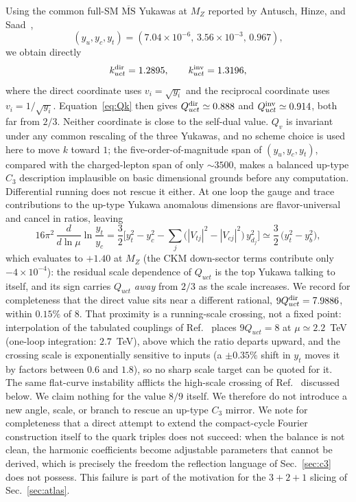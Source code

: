 \documentclass[aps,twocolumn,superscriptaddress,nofootinbib,floatfix]{revtex4-2}
\newcommand{\MSbar}{\overline{\mathrm{MS}}}
\begin{document}
Using the common full-SM $\MSbar$ Yukawas at $M_Z$ reported by Antusch, Hinze, and Saad~\cite{Antusch2026},
\begin{equation}
(y_u,y_c,y_t)=(7.04\times10^{-6},\,3.56\times10^{-3},\,0.967),
\end{equation}
we obtain directly
\begin{equation}
k_{uct}^{\rm dir}=1.2895,
\qquad
k_{uct}^{\rm inv}=1.3196,
\label{eq:upfail}
\end{equation}
where the direct coordinate uses $v_i=\sqrt{y_i}$ and the reciprocal coordinate uses $v_i=1/\sqrt{y_i}$. Equation~\eqref{eq:Qk} then gives $Q_{uct}^{\rm dir}\simeq0.888$ and $Q_{uct}^{\rm inv}\simeq0.914$, both far from $2/3$. Neither coordinate is close to the self-dual value. $Q_v$ is invariant under any common rescaling of the three Yukawas, and no scheme choice is used here to move $k$ toward $1$; the five-order-of-magnitude span of $(y_u,y_c,y_t)$, compared with the charged-lepton span of only $\sim3500$, makes a balanced up-type $C_3$ description implausible on basic dimensional grounds before any computation. Differential running does not rescue it either. At one loop the gauge and trace contributions to the up-type Yukawa anomalous dimensions are flavor-universal and cancel in ratios, leaving
\begin{equation}
16\pi^2\,\frac{d}{d\ln\mu}\ln\frac{y_t}{y_c}
=\frac32\Big[y_t^2-y_c^2-\sum_j\big(|V_{tj}|^2-|V_{cj}|^2\big)\,y_{d_j}^2\Big]
\simeq\frac32\,\big(y_t^2-y_b^2\big),
\label{eq:drift}
\end{equation}
which evaluates to $+1.40$ at $M_Z$ (the CKM down-sector terms contribute only $-4\times10^{-4}$): the residual scale dependence of $Q_{uct}$ is the top Yukawa talking to itself, and its sign carries $Q_{uct}$ \emph{away} from $2/3$ as the scale increases. We record for completeness that the direct value sits near a different rational, $9Q_{uct}^{\rm dir}=7.9886$, within $0.15\%$ of $8$. That proximity is a running-scale crossing, not a fixed point: interpolation of the tabulated couplings of Ref.~\cite{Antusch2026} places $9Q_{uct}=8$ at $\mu\simeq2.2$~TeV (one-loop integration: $2.7$~TeV), above which the ratio departs upward, and the crossing scale is exponentially sensitive to inputs (a $\pm0.35\%$ shift in $y_t$ moves it by factors between $0.6$ and $1.8$), so no sharp scale target can be quoted for it. The same flat-curve instability afflicts the high-scale crossing of Ref.~\cite{Rivero2026} discussed below. We claim nothing for the value $8/9$ itself. We therefore do not introduce a new angle, scale, or branch to rescue an up-type $C_3$ mirror. We note for completeness that a direct attempt to extend the compact-cycle Fourier construction itself to the quark triples does not succeed: when the balance is not clean, the harmonic coefficients become adjustable parameters that cannot be derived, which is precisely the freedom the reflection language of Sec.~\ref{sec:c3} does not possess. This failure is part of the motivation for the $3+2+1$ slicing of Sec.~\ref{sec:atlas}.
\end{document}
